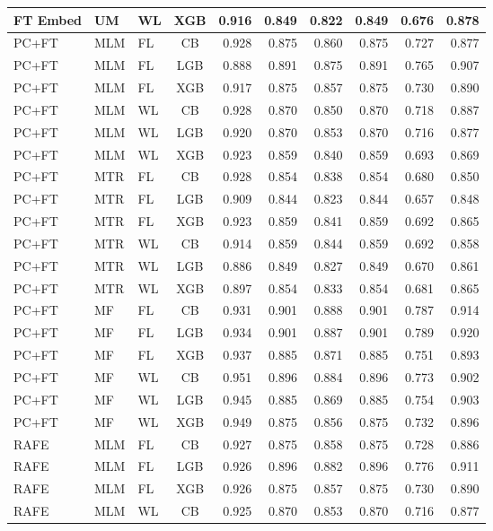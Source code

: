 \documentclass[9pt,a4paper]{article}
\begin{document}
\begin{scriptsize}
\begin{longtable}{lllcrrrrrr}
FT Embed & UM  & WL & XGB & 0.916 & 0.849 & 0.822 & 0.849 & 0.676 & 0.878 \\
\midrule
PC+FT & MLM & FL & CB  & 0.928 & 0.875 & 0.860 & 0.875 & 0.727 & 0.877 \\
PC+FT & MLM & FL & LGB & 0.888 & 0.891 & 0.875 & 0.891 & 0.765 & 0.907 \\
PC+FT & MLM & FL & XGB & 0.917 & 0.875 & 0.857 & 0.875 & 0.730 & 0.890 \\
PC+FT & MLM & WL & CB  & 0.928 & 0.870 & 0.850 & 0.870 & 0.718 & 0.887 \\
PC+FT & MLM & WL & LGB & 0.920 & 0.870 & 0.853 & 0.870 & 0.716 & 0.877 \\
PC+FT & MLM & WL & XGB & 0.923 & 0.859 & 0.840 & 0.859 & 0.693 & 0.869 \\
PC+FT & MTR & FL & CB  & 0.928 & 0.854 & 0.838 & 0.854 & 0.680 & 0.850 \\
PC+FT & MTR & FL & LGB & 0.909 & 0.844 & 0.823 & 0.844 & 0.657 & 0.848 \\
PC+FT & MTR & FL & XGB & 0.923 & 0.859 & 0.841 & 0.859 & 0.692 & 0.865 \\
PC+FT & MTR & WL & CB  & 0.914 & 0.859 & 0.844 & 0.859 & 0.692 & 0.858 \\
PC+FT & MTR & WL & LGB & 0.886 & 0.849 & 0.827 & 0.849 & 0.670 & 0.861 \\
PC+FT & MTR & WL & XGB & 0.897 & 0.854 & 0.833 & 0.854 & 0.681 & 0.865 \\
PC+FT & MF  & FL & CB  & 0.931 & 0.901 & 0.888 & 0.901 & 0.787 & 0.914 \\
PC+FT & MF  & FL & LGB & 0.934 & 0.901 & 0.887 & 0.901 & 0.789 & 0.920 \\
PC+FT & MF  & FL & XGB & 0.937 & 0.885 & 0.871 & 0.885 & 0.751 & 0.893 \\
PC+FT & MF  & WL & CB  & 0.951 & 0.896 & 0.884 & 0.896 & 0.773 & 0.902 \\
PC+FT & MF  & WL & LGB & 0.945 & 0.885 & 0.869 & 0.885 & 0.754 & 0.903 \\
PC+FT & MF  & WL & XGB & 0.949 & 0.875 & 0.856 & 0.875 & 0.732 & 0.896 \\
\midrule
RAFE & MLM & FL & CB  & 0.927 & 0.875 & 0.858 & 0.875 & 0.728 & 0.886 \\
RAFE & MLM & FL & LGB & 0.926 & 0.896 & 0.882 & 0.896 & 0.776 & 0.911 \\
RAFE & MLM & FL & XGB & 0.926 & 0.875 & 0.857 & 0.875 & 0.730 & 0.890 \\
RAFE & MLM & WL & CB  & 0.925 & 0.870 & 0.853 & 0.870 & 0.716 & 0.877 \\

\end{longtable}
\end{scriptsize}
\end{document}
